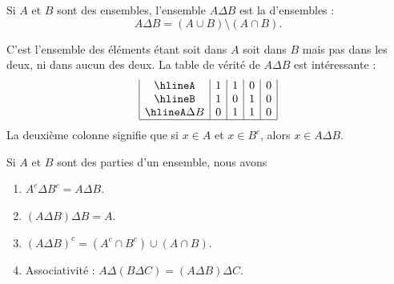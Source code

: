 \begin{definition}    \label{DefBMLooVjlSG}
	Si \( A\) et \( B\) sont des ensembles, l'ensemble \( A\Delta B\) est la  d'ensembles :
	\begin{equation}
		A\Delta B=(A\cup B)\setminus(A\cap B).
	\end{equation}
\end{definition}
C'est l'ensemble des éléments étant soit dans \( A\) soit dans \( B\) mais pas dans les deux, ni dans aucun des deux. La table de vérité de \( A\Delta B\) est intéressante :
\begin{equation}        \label{EQooOJBOooKkKbYp}
	\begin{array}{|c|c|c|c|c|}
		\hline%
		A         & 1 & 1 & 0 & 0 \\
		\hline%
		B         & 1 & 0 & 1 & 0 \\
		\hline%
		A\Delta B & 0 & 1 & 1 & 0 \\
		\hline%
	\end{array}
\end{equation}
La deuxième colonne signifie que si \( x\in A\) et \( x\in B^c\), alors \( x\in A\Delta B\).

\begin{lemma}   \label{LemCUVoohKpWB}
	Si \( A\) et \( B\) sont des parties d'un ensemble, nous avons
	\begin{enumerate}
		\item       \label{ItemVUCooHAztC}
		      \( A^c\Delta B^c=A\Delta B\).
		\item\label{ItemVUCooHAztCii}
		      \( (A\Delta B)\Delta B=A\).
		\item       \label{ITEMooSPZXooPTgisP}
		      \( (A\Delta B)^c=(A^c\cap B^c)\cup(A\cap B)\).
		\item       \label{ITEMooSMXWooYcWsRC}
		      Associativité : \( A\Delta (B\Delta C)=(A\Delta B)\Delta C\).
	\end{enumerate}
\end{lemma}

